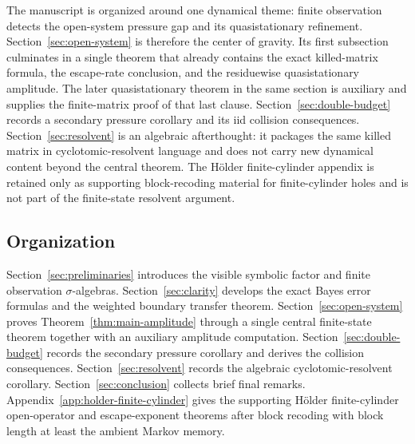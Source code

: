 The manuscript is organized around one dynamical theme: finite
observation detects the open-system pressure gap and its
quasistationary refinement.
Section~\ref{sec:open-system} is therefore the center of gravity.  Its
first subsection culminates in a single theorem that already contains
the exact killed-matrix formula, the escape-rate conclusion, and the
residuewise quasistationary amplitude.  The later quasistationary
theorem in the same section is auxiliary and supplies the finite-matrix
proof of that last clause.  Section~\ref{sec:double-budget} records a
secondary pressure corollary and its iid collision consequences.
Section~\ref{sec:resolvent} is an algebraic afterthought: it packages
the same killed matrix in cyclotomic-resolvent language and does not
carry new dynamical content beyond the central theorem.  The H\"older
finite-cylinder appendix is retained only as supporting block-recoding
material for finite-cylinder holes and is not part of the finite-state
resolvent argument.

\subsection*{Organization}

Section~\ref{sec:preliminaries} introduces the visible symbolic factor
and finite observation \(\sigma\)-algebras.
Section~\ref{sec:clarity} develops the exact Bayes error formulas and
the weighted boundary transfer theorem.
Section~\ref{sec:open-system} proves
Theorem~\ref{thm:main-amplitude} through a single central finite-state
theorem together with an auxiliary amplitude computation.
Section~\ref{sec:double-budget} records the secondary pressure
corollary and derives the collision consequences.
Section~\ref{sec:resolvent} records the algebraic cyclotomic-resolvent
corollary.
Section~\ref{sec:conclusion} collects brief final remarks.
Appendix~\ref{app:holder-finite-cylinder} gives the supporting H\"older
finite-cylinder open-operator and escape-exponent theorems after
block recoding with block length at least the ambient Markov memory.
